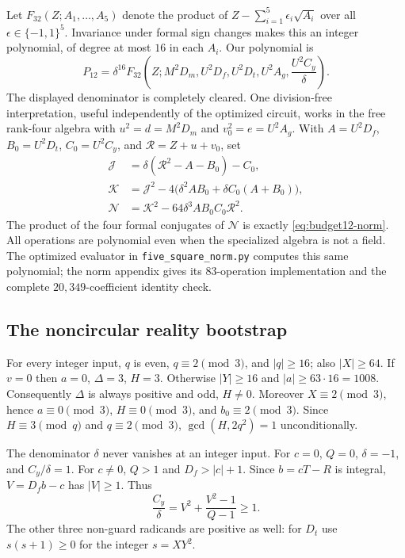 Let $F_{32}(Z;A_1,\ldots,A_5)$ denote the product of
$Z-\sum_{i=1}^5\epsilon_i\sqrt{A_i}$ over all
$\epsilon\in\{-1,1\}^5$.  Invariance under formal sign changes makes
this an integer polynomial, of degree at most $16$ in each $A_i$.
Our polynomial is
\begin{equation}
\label{eq:budget12-norm}
 P_{12}=\delta^{16}F_{32}\left(
 Z;M^2D_m,U^2D_f,U^2D_t,U^2A_g,
 \frac{U^2C_y}{\delta}\right).
\end{equation}
The displayed denominator is completely cleared.  One division-free
interpretation, useful independently of the optimized circuit, works in
the free rank-four algebra with $u^2=d=M^2D_m$ and
$v_0^2=e=U^2A_g$.  With $A=U^2D_f$, $B_0=U^2D_t$,
$C_0=U^2C_y$, and $\mathcal R=Z+u+v_0$, set
\begin{align*}
 \mathcal J&=\delta(\mathcal R^2-A-B_0)-C_0,\\
 \mathcal K&=\mathcal J^2-4\bigl(\delta^2AB_0+
                      \delta C_0(A+B_0)\bigr),\\
 \mathcal N&=\mathcal K^2-64\delta^3AB_0C_0\mathcal R^2.
\end{align*}
The product of the four formal conjugates of $\mathcal N$ is exactly
\eqref{eq:budget12-norm}.  All operations are polynomial even when the
specialized algebra is not a field.  The optimized evaluator in
\texttt{five\_square\_norm.py} computes this same polynomial; the norm
appendix gives its $83$-operation implementation and the complete
$20{,}349$-coefficient identity check.

\subsection{The noncircular reality bootstrap}

For every integer input, $q$ is even, $q\equiv2\pmod3$, and
$|q|\ge16$; also $|X|\ge64$.  If $v=0$ then $a=0$, $\Delta=3$,
$H=3$.  Otherwise $|Y|\ge16$ and $|a|\ge63\cdot16=1008$.
Consequently $\Delta$ is always positive and odd, $H\ne0$. Moreover $X\equiv2\pmod3$, hence
$a\equiv0\pmod3$, $H\equiv0\pmod3$, and $b_0\equiv2\pmod3$.
Since $H\equiv3\pmod q$ and $q\equiv2\pmod3$,
$\gcd(H,2q^2)=1$ unconditionally.

The denominator $\delta$ never vanishes at an integer input.  For
$c=0$, $Q=0$, $\delta=-1$, and $C_y/\delta=1$.  For $c\ne0$,
$Q>1$ and $D_f>|c|+1$.  Since $b=cT-R$ is integral,
$V=D_fb-c$ has $|V|\ge1$.  Thus
\[
 \frac{C_y}{\delta}
 =V^2+\frac{V^2-1}{Q-1}\ge1.
\]
The other three non-guard radicands are positive as well: for $D_t$
use $s(s+1)\ge0$ for the integer $s=XY^2$.

